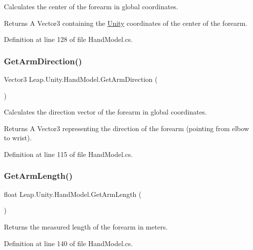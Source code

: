Calculates the center of the forearm in global coordinates. \begin{DoxyReturn}{Returns}
A Vector3 containing the \mbox{\hyperlink{namespace_leap_1_1_unity}{Unity}} coordinates of the center of the forearm. 
\end{DoxyReturn}


Definition at line 128 of file Hand\+Model.\+cs.

\mbox{\label{class_leap_1_1_unity_1_1_hand_model_a1c754fe7a7778b4aa3bb3191f63ac13c}} 
\subsubsection{\texorpdfstring{GetArmDirection()}{GetArmDirection()}}
{\footnotesize\ttfamily Vector3 Leap.\+Unity.\+Hand\+Model.\+Get\+Arm\+Direction (\begin{DoxyParamCaption}{ }\end{DoxyParamCaption})}

Calculates the direction vector of the forearm in global coordinates. \begin{DoxyReturn}{Returns}
A Vector3 representing the direction of the forearm (pointing from elbow to wrist). 
\end{DoxyReturn}


Definition at line 115 of file Hand\+Model.\+cs.

\mbox{\label{class_leap_1_1_unity_1_1_hand_model_af2b710f410b9eacd44d9ec1d3e36bad6}} 
\subsubsection{\texorpdfstring{GetArmLength()}{GetArmLength()}}
{\footnotesize\ttfamily float Leap.\+Unity.\+Hand\+Model.\+Get\+Arm\+Length (\begin{DoxyParamCaption}{ }\end{DoxyParamCaption})}

Returns the measured length of the forearm in meters. 

Definition at line 140 of file Hand\+Model.\+cs.


